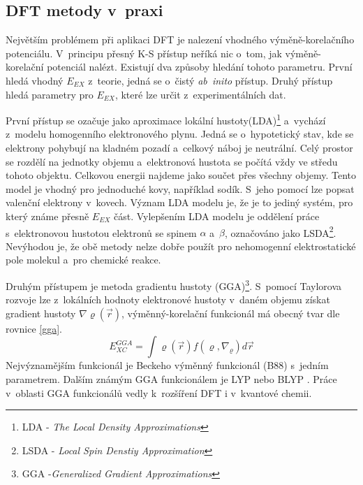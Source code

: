 \documentclass[
digital, %
table,   %
lof,     %
lot,     %
oneside,
]{fithesis3}
\begin{document}
\subsection{DFT metody v~praxi}
Největším problémem při aplikaci DFT je nalezení vhodného výměně-korelačního potenciálu. V~principu přesný K-S přístup neříká nic o~tom, jak výměně-korelační potenciál nalézt. Existují dva způsoby hledání tohoto parametru. První hledá vhodný $E_{EX}$ z~teorie, jedná se o~čistý \textit{ab~inito} přístup. Druhý přístup hledá parametry pro $E_{EX}$, které lze určit z~experimentálních dat.

První přístup se ozačuje jako aproximace lokální hustoty(LDA)\footnote{LDA - \textit{The Local Density Approximations}} a~vychází z~modelu homogenního elektronového plynu. Jedná se o~hypotetický stav, kde se elektrony pohybují na kladném pozadí a~celkový náboj je neutrální. Celý prostor se rozdělí na jednotky objemu a~elektronová hustota se počítá vždy ve středu tohoto objektu. Celkovou energii najdeme jako součet přes všechny objemy. Tento model je vhodný pro jednoduché kovy, například sodík. S~jeho pomocí lze popsat valenční elektrony v~kovech. Význam LDA modelu je, že je to jediný systém, pro který známe přesně $E_{EX}$ část. Vylepšením LDA modelu je oddělení práce s~elektronovou hustotou elektronů se spinem $\alpha$ a~$\beta$, označováno jako LSDA\footnote{LSDA - \textit{Local Spin Denstiy Approximation}}. Nevýhodou je, že obě metody nelze dobře použít pro nehomogenní elektrostatické pole molekul a~pro chemické reakce.

Druhým přístupem je metoda gradientu hustoty (GGA)\footnote{GGA -\textit{Generalized Gradient Approximations}}. S~pomocí Taylorova rozvoje lze z~lokálních hodnoty elektronové hustoty v~daném objemu získat gradient hustoty $\nabla \varrho(\vec{r})$, výměnný-korelační funkcionál má obecný tvar dle rovnice \ref{gga}.
\begin{equation}
E_{XC}^{GGA} = \int \varrho(\vec{r})f(\varrho, \nabla_{\varrho})d\vec{r}
\label{gga}
\end{equation}
Nejvýznamějším funkcionál je Beckeho výměnný funkcionál (B88)\cite{b88} s~jedním parametrem. Dalším známým GGA funkcionálem je LYP \cite{lyp} nebo BLYP \cite{blyp}. Práce v~oblasti GGA funkcionálů vedly k~rozšíření DFT i v~kvantové chemii.
\end{document}

